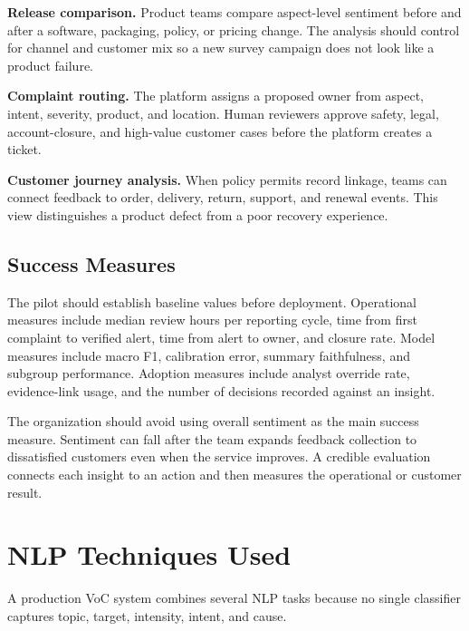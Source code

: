 \documentclass[11pt,a4paper,twoside]{article}
\begin{document}
\textbf{Release comparison.} Product teams compare aspect-level sentiment before and after a software, packaging, policy, or pricing change. The analysis should control for channel and customer mix so a new survey campaign does not look like a product failure.

\textbf{Complaint routing.} The platform assigns a proposed owner from aspect, intent, severity, product, and location. Human reviewers approve safety, legal, account-closure, and high-value customer cases before the platform creates a ticket.

\textbf{Customer journey analysis.} When policy permits record linkage, teams can connect feedback to order, delivery, return, support, and renewal events. This view distinguishes a product defect from a poor recovery experience.

\subsection{Success Measures}

The pilot should establish baseline values before deployment. Operational measures include median review hours per reporting cycle, time from first complaint to verified alert, time from alert to owner, and closure rate. Model measures include macro F1, calibration error, summary faithfulness, and subgroup performance. Adoption measures include analyst override rate, evidence-link usage, and the number of decisions recorded against an insight.

The organization should avoid using overall sentiment as the main success measure. Sentiment can fall after the team expands feedback collection to dissatisfied customers even when the service improves. A credible evaluation connects each insight to an action and then measures the operational or customer result.

\newpage

\section{NLP Techniques Used}

A production VoC system combines several NLP tasks because no single classifier captures topic, target, intensity, intent, and cause.
\end{document}
